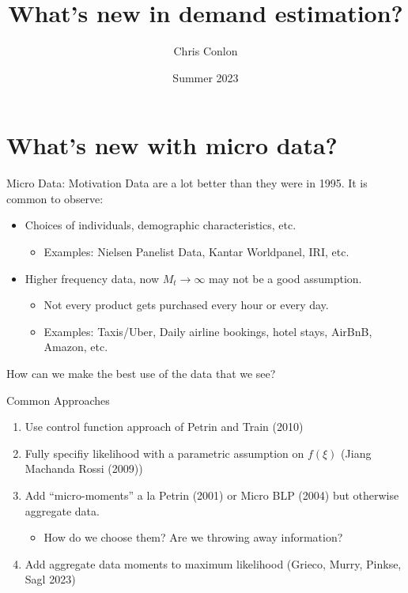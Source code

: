 \documentclass[aspectratio=169,10pt]{beamer}
\title{What's new in demand estimation?}
\author{Chris Conlon}
\institute{KU Leuven}
\date{Summer 2023}
\begin{document}
\begin{frame}[plain] %
\titlepage
\end{frame}


\section*{What's new with micro data?}

\begin{frame}{Micro Data: Motivation}
Data are a lot better than they were in 1995. It is common to observe:
\begin{itemize}
\item Choices of individuals, demographic characteristics, etc.
\begin{itemize}
\item Examples: Nielsen Panelist Data, Kantar Worldpanel, IRI, etc.
\end{itemize}
\item Higher frequency data, now $M_t \rightarrow \infty$ may not be a good assumption.
\begin{itemize}
    \item Not every product gets purchased every hour or every day.
    \item Examples: Taxis/Uber, Daily airline bookings, hotel stays, AirBnB, Amazon, etc.
\end{itemize}
\end{itemize}
How can we make the best use of the data that we see?
\end{frame}


\begin{frame}{Common Approaches}
\begin{enumerate}
\item Use control function approach of Petrin and Train (2010)
\item Fully specifiy likelihood with a parametric assumption on $f(\xi)$ (Jiang Machanda Rossi (2009))
\item Add ``micro-moments'' a la Petrin (2001) or Micro BLP (2004) but otherwise aggregate data.
\begin{itemize}
\item How do we choose them? Are we throwing away information?
\end{itemize}
\item Add aggregate data moments to maximum likelihood (Grieco, Murry, Pinkse, Sagl 2023)
\end{enumerate}
\end{frame}
\end{document}
